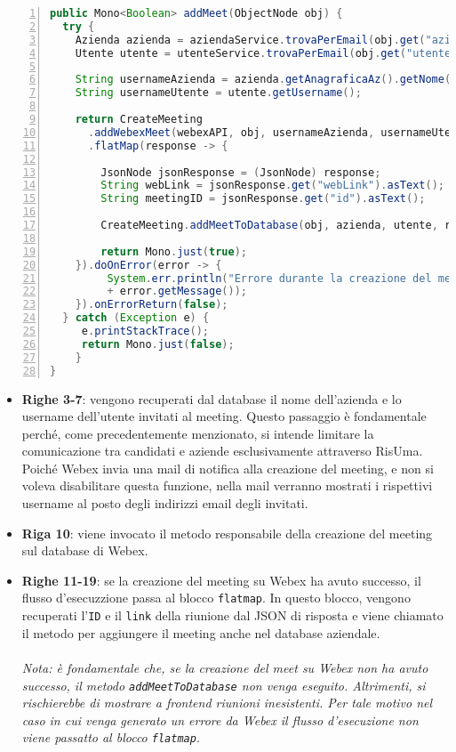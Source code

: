 \vspace{0.3cm}
\begin{lstlisting}[language=java, frame=lines, basicstyle=\ttfamily\scriptsize, numbers=left]
public Mono<Boolean> addMeet(ObjectNode obj) {
  try {
    Azienda azienda = aziendaService.trovaPerEmail(obj.get("azienda").asText());
    Utente utente = utenteService.trovaPerEmail(obj.get("utente").asText());

    String usernameAzienda = azienda.getAnagraficaAz().getNome();
    String usernameUtente = utente.getUsername();

    return CreateMeeting
      .addWebexMeet(webexAPI, obj, usernameAzienda, usernameUtente)
      .flatMap(response -> {

	    JsonNode jsonResponse = (JsonNode) response;
	    String webLink = jsonResponse.get("webLink").asText();
	    String meetingID = jsonResponse.get("id").asText();

	    CreateMeeting.addMeetToDatabase(obj, azienda, utente, repo, webLink, meetingID);

	    return Mono.just(true);
    }).doOnError(error -> {
         System.err.println("Errore durante la creazione del meeting su Webex: "
         + error.getMessage());
    }).onErrorReturn(false);
  } catch (Exception e) {
     e.printStackTrace();
     return Mono.just(false);
    }
}
\end{lstlisting}
\begin{itemize}
    \item \textbf{Righe 3-7}: vengono recuperati dal database il nome dell'azienda e lo username dell'utente invitati al meeting. 
    Questo passaggio è fondamentale perché, come precedentemente menzionato, si intende limitare la comunicazione tra candidati 
    e aziende esclusivamente attraverso RisUma. Poiché Webex invia una mail di notifica alla creazione del meeting, e non si voleva
    disabilitare questa funzione, nella mail verranno mostrati i rispettivi username al posto degli indirizzi email degli invitati.

    \item \textbf{Riga 10}: viene invocato il metodo responsabile della creazione del meeting sul database di Webex.

    \item \textbf{Righe 11-19}: se la creazione del meeting su Webex ha avuto successo, il flusso d'esecuzzione passa al 
    blocco \texttt{flatmap}. In questo blocco, vengono recuperati l'\texttt{ID} e il \texttt{link} della riunione dal JSON di risposta 
    e viene chiamato il metodo per aggiungere il meeting anche nel database aziendale.
    \\\\
    \textit{Nota: è fondamentale che, se la creazione del meet su Webex non ha avuto successo, il metodo
    \texttt{addMeetToDatabase} non venga eseguito. Altrimenti, si rischierebbe di mostrare a frontend riunioni inesistenti.
    Per tale motivo nel caso in cui venga generato un errore da Webex il flusso d'esecuzione non viene passatto al blocco \texttt{flatmap}}.
\end{itemize}
